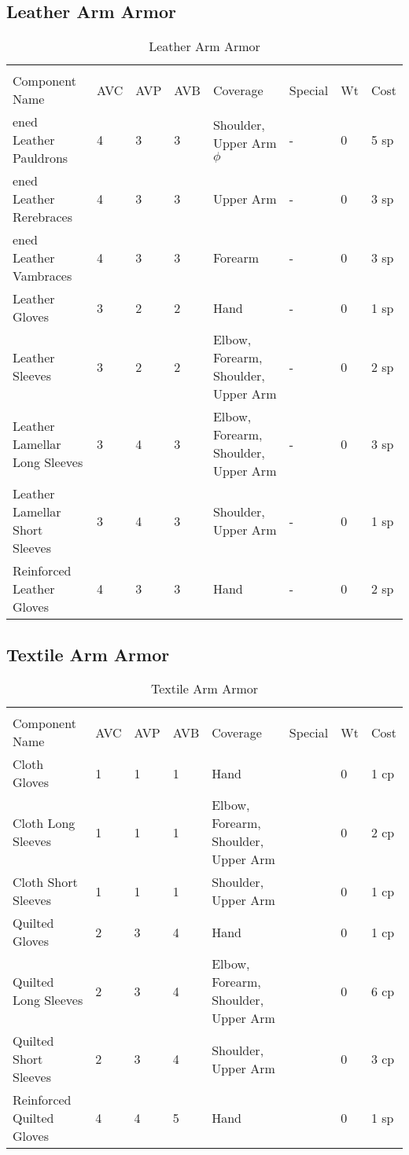 \documentclass[oneside,11pt,english]{book}
\begin{document}
\subsection{Leather Arm Armor}
\begin{longtabu}to 
  \captionsetup{textformat=empty, labelformat=blank}
  \caption{Leather Arm Armor} \vspace{-15pt}
  \label{tab:Leather Arm Armor}\\
  Component Name&AVC&AVP&AVB& Coverage& Special& Wt&Cost\\\toprule
  ened Leather Pauldrons& 4& 3& 3& Shoulder, Upper Arm\hyperref[sec:Weak Spots]{$\phi$} &-& 0& 5 sp\\
  ened Leather Rerebraces& 4& 3& 3& Upper Arm &-& 0& 3 sp\\
  ened Leather Vambraces& 4& 3& 3& Forearm &-& 0& 3 sp\\
  Leather Gloves& 3& 2& 2& Hand &-& 0& 1 sp\\
  Leather Sleeves& 3& 2& 2& Elbow, Forearm, Shoulder, Upper Arm &-& 0& 2 sp\\
  Leather Lamellar Long Sleeves& 3& 4& 3& Elbow, Forearm, Shoulder, Upper Arm &-& 0& 3 sp\\
  Leather Lamellar Short Sleeves& 3& 4& 3& Shoulder, Upper Arm &-& 0& 1 sp\\
  Reinforced Leather Gloves& 4& 3& 3& Hand &-& 0& 2 sp\\
\end{longtabu}
\subsection{Textile Arm Armor}
\begin{longtabu} to 
  \captionsetup{textformat=empty, labelformat=blank}
  \caption{Textile Arm Armor} \vspace{-15pt}
  \label{tab:Textile Arm Armor}\\
  Component Name&AVC&AVP&AVB& Coverage& Special& Wt&Cost\\\toprule
  Cloth Gloves& 1& 1& 1& Hand& & 0& 1 cp\\
  Cloth Long Sleeves& 1& 1& 1& Elbow, Forearm, Shoulder, Upper Arm& & 0& 2 cp\\
  Cloth Short Sleeves& 1& 1& 1& Shoulder, Upper Arm& & 0& 1 cp\\
  Quilted Gloves& 2& 3& 4& Hand& & 0& 1 cp\\
  Quilted Long Sleeves& 2& 3& 4& Elbow, Forearm, Shoulder, Upper Arm& & 0& 6 cp\\
  Quilted Short Sleeves& 2& 3& 4& Shoulder, Upper Arm& & 0& 3 cp\\
  Reinforced Quilted Gloves& 4& 4& 5& Hand& & 0& 1 sp\\
\end{longtabu}
\end{document}
